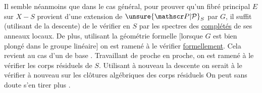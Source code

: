 Il semble néanmoins que dans le cas général, pour prouver qu’un fibré principal $E$ sur $X-S$ provient d’une  extension de ${\unsure{\mathscr P|\mathcal P}}_S$ par $G$, il suffit (utilisant {} de la descente) de le vérifier en {} $S$ par les spectres des \uline{complétés} de ses anneaux locaux.
De plus, utilisant la géométrie formelle [lorsque $G$ est bien plongé dans le groupe  linéaire] on est ramené à le vérifier \uline{formellement}.
Cela revient au cas d’un {} de base {}. Travaillant de proche en proche, on est ramené à le vérifier {} \uline{{}} les corps résiduels de $S$.
Utilisant à nouveau la descente on serait {} à le vérifier à nouveau sur les clôtures algébriques des corps résiduels{} On peut sans doute s’en tirer plus {}.
